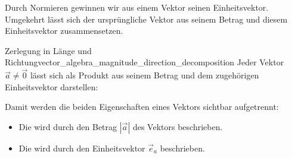 Durch Normieren gewinnen wir aus einem Vektor seinen Einheitsvektor.
Umgekehrt lässt sich der ursprüngliche Vektor aus seinem Betrag und diesem
Einheitsvektor zusammensetzen.

\begin{TheoremBox}{Zerlegung in Länge und Richtung}{vector_algebra_magnitude_direction_decomposition}
  Jeder Vektor $\vec a\ne\vec 0$ lässt sich als Produkt aus seinem Betrag und
  dem zugehörigen Einheitsvektor darstellen:
  \begin{center}
  \end{center}
  Damit werden die beiden Eigenschaften eines Vektors sichtbar aufgetrennt:
  \begin{itemize}[leftmargin=1.7em,topsep=0.7em,itemsep=0.35em]
    \item Die  wird durch den Betrag $|\vec a|$ des Vektors beschrieben.
    \item Die  wird durch den Einheitsvektor $\vec e_a$ beschrieben.
  \end{itemize}
\end{TheoremBox}

\clearpage

